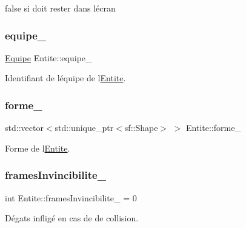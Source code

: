 false si doit rester dans l\textquotesingle{}écran 

\mbox{\label{class_entite_a5fe5eca94bde526873a68163a94011ef}} 
\subsubsection{\texorpdfstring{equipe\+\_\+}{equipe\_}}
{\footnotesize\ttfamily \hyperlink{constantes_8h_a08fa5554288d5031a8f3bb83cc04ee83}{Equipe} Entite\+::equipe\+\_\+\hspace{0.3cm}{\ttfamily [protected]}}



Identifiant de l\textquotesingle{}équipe de l\textquotesingle{}\hyperlink{class_entite}{Entite}. 

\mbox{\label{class_entite_aa6bbda9a40f701f273c344406a6f5122}} 
\subsubsection{\texorpdfstring{forme\+\_\+}{forme\_}}
{\footnotesize\ttfamily std\+::vector$<$std\+::unique\+\_\+ptr$<$sf\+::\+Shape$>$ $>$ Entite\+::forme\+\_\+\hspace{0.3cm}{\ttfamily [protected]}}



Forme de l\textquotesingle{}\hyperlink{class_entite}{Entite}. 

\mbox{\label{class_entite_a5d0ff5a27232c8c29436a871a8306581}} 
\subsubsection{\texorpdfstring{frames\+Invincibilite\+\_\+}{framesInvincibilite\_}}
{\footnotesize\ttfamily int Entite\+::frames\+Invincibilite\+\_\+ = 0\hspace{0.3cm}{\ttfamily [protected]}}



Dégats infligé en cas de de collision. 

